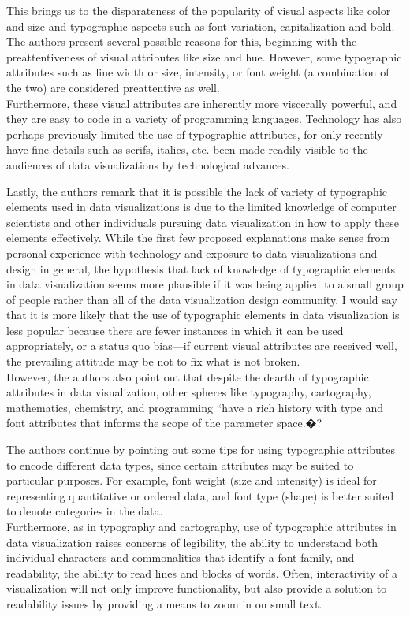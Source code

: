 \documentclass[]{book}
\theoremstyle{definition}
\theoremstyle{definition}
\theoremstyle{definition}
\theoremstyle{remark}
\begin{document}
This brings us to the disparateness of the popularity of visual aspects
like color and size and typographic aspects such as font variation,
capitalization and bold. The authors present several possible reasons
for this, beginning with the preattentiveness of visual attributes like
size and hue. However, some typographic attributes such as line width or
size, intensity, or font weight (a combination of the two) are
considered preattentive as well.\\
Furthermore, these visual attributes are inherently more viscerally
powerful, and they are easy to code in a variety of programming
languages. Technology has also perhaps previously limited the use of
typographic attributes, for only recently have fine details such as
serifs, italics, etc. been made readily visible to the audiences of data
visualizations by technological advances.

Lastly, the authors remark that it is possible the lack of variety of
typographic elements used in data visualizations is due to the limited
knowledge of computer scientists and other individuals pursuing data
visualization in how to apply these elements effectively. While the
first few proposed explanations make sense from personal experience with
technology and exposure to data visualizations and design in general,
the hypothesis that lack of knowledge of typographic elements in data
visualization seems more plausible if it was being applied to a small
group of people rather than all of the data visualization design
community. I would say that it is more likely that the use of
typographic elements in data visualization is less popular because there
are fewer instances in which it can be used appropriately, or a status
quo bias---if current visual attributes are received well, the
prevailing attitude may be not to fix what is not broken.\\
However, the authors also point out that despite the dearth of
typographic attributes in data visualization, other spheres like
typography, cartography, mathematics, chemistry, and programming ``have
a rich history with type and font attributes that informs the scope of
the parameter space.�?

The authors continue by pointing out some tips for using typographic
attributes to encode different data types, since certain attributes may
be suited to particular purposes. For example, font weight (size and
intensity) is ideal for representing quantitative or ordered data, and
font type (shape) is better suited to denote categories in the data.\\
Furthermore, as in typography and cartography, use of typographic
attributes in data visualization raises concerns of legibility, the
ability to understand both individual characters and commonalities that
identify a font family, and readability, the ability to read lines and
blocks of words. Often, interactivity of a visualization will not only
improve functionality, but also provide a solution to readability issues
by providing a means to zoom in on small text.
\end{document}
